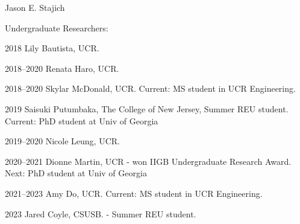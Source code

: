 \documentclass[10pt]{article}
\begin{document}
\begin{cv}{\centerline{Jason E. Stajich}}
\begin{cvlistcompact}{Undergraduate Researchers:}
\item [2018] Lily Bautista, UCR.
\item [2018--2020] Renata Haro, UCR.
\item [2018--2020] Skylar McDonald, UCR. Current: MS student in UCR Engineering.
\item [2019] Saisuki Putumbaka, The College of New Jersey, Summer REU student. Current: PhD student at Univ of Georgia
\item [2019--2020] Nicole Leung, UCR.
\item [2020--2021] Dionne Martin, UCR - won IIGB Undergraduate Research Award. Next: PhD student at Univ of Georgia
\item [2021--2023] Amy Do, UCR. Current: MS student in UCR Engineering.
\item [2023] Jared Coyle, CSUSB. - Summer REU student.

\end{cvlistcompact}


\end{cv}
\end{document}

